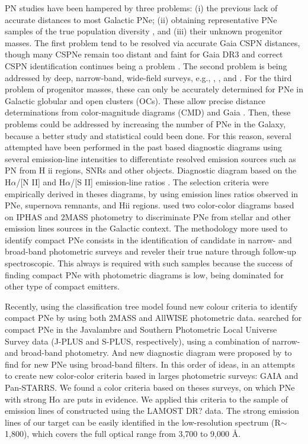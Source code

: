 \documentclass[fleqn,usenatbib]{mnras}
\begin{document}
PN studies have been hampered by three problems:
(i) the previous lack of accurate distances to most Galactic
PNe; (ii) obtaining representative PNe samples of the true
population diversity \citep{Parker:2022}, and (iii) their unknown
progenitor masses. The first problem tend to be
resolved via accurate Gaia CSPN distances, though many
CSPNe remain too distant and faint for Gaia DR3 and correct
CSPN identification continues being a problem \citep{Parker:2022}.
The second problem is being addressed by deep, narrow-band,
wide-field surveys, e.g., \citet{Parker:2005},
\citet{Drew:2005}, and \citet{Drew:2014}. For the third problem
of progenitor masses, these can only be accurately determined for
PNe in Galactic globular and open clusters (OCs). These allow precise
distance determinations from color-magnitude diagrams (CMD) and Gaia
\citep{Fragkou:2022}. Then, these problems could be addressed by increasing the
number of PNe in the Galaxy, because a better study and statistical
could been done. For this reason, several attempted have been performed
in the past based diagnostic diagrams using several emission-line
intensities to differentiate resolved emission
sources such as PN from H {\sc ii} regions, SNRs and other objects.
Diagnostic diagram based on the H{$\alpha$}/[N II] and H{$\alpha$}/[S II]
emission-line ratios \citep{Sabbadin:1977, Fesen:1985, Riesgo:2006}.
The selection criteria were empirically derived in theses diagrams,
by using emission lines ratios observed in PNe, supernova remnants, and H{\sc ii}
regions. \citet{Viironen:2009a, Viironen:2009b} used two color-color diagrams
based on IPHAS and 2MASS photometry to discriminate PNe from stellar and other
emission lines sources in the Galactic context. The methodology more used to
identify compact PNe consists in the identification of candidate in narrow- and broad-band
photometric surveys and reveler their true nature through follow-up
spectroscopic. This always is required with such samples because the success
of finding compact PNe with photometric diagrams is low, being dominated for
other type of compact emitters.

Recently, \citet{Akras:2019b} using the classification tree model
found new colour criteria to identify compact PNe by
using both 2MASS and AllWISE photometric data. \citet{Gutierrez-Soto:2020}
searched for compact PNe in the Javalambre and Southern Photometric Local
Universe Survey data (J-PLUS and S-PLUS, respectively), using a combination
of narrow- and broad-band photometry. And new diagnostic diagram were proposed
by \citet{Vejar:2019} to find for new PNe using broad-band filters.
In this order of ideas, in an attempts to create new color-color criteria based
in larges photometric surveys: GAIA and Pan-STARRS. We found a color criteria
based on theses surveys, on which PNe with strong H{$\alpha$} are puts in
evidence. We applied this criteria to the sample of emission lines of \citet{Skoda:2020}
constructed using the LAMOST DR? data. The strong emission lines of our target can
be easily identiﬁed in the low-resolution spectrum (R$\sim$1,800), which covers
the full optical range from 3,700 to 9,000 \AA.
\end{document}
